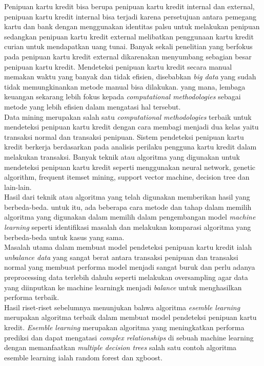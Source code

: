 Penipuan kartu kredit bisa berupa penipuan kartu kredit internal dan external, penipuan kartu kredit internal bisa terjadi karena persetujuan antara pemegang kartu dan bank dengan menggunakan identitas palsu untuk melakukan penipuan sedangkan penipuan kartu kredit external melibatkan penggunaan kartu kredit curian untuk mendapatkan uang tunai\cite{chaudhary2012review}. Banyak sekali penelitian yang berfokus pada penipuan kartu kredit external dikarenakan menyumbang sebagian besar penipuan kartu kredit\cite{chase_jpmorgan_fraud_management}. Mendeteksi penipuan kartu kredit secara manual memakan waktu yang banyak dan tidak efisien, disebabkan \textit{big data} yang sudah tidak memungkinankan metode manual bisa dilakukan. yang mana, lembaga keuangan sekarang lebih fokus kepada \textit{computational methodologies} sebagai metode yang lebih efisien dalam mengatasi hal tersebut\cite{west2016intelligent}.\\
Data mining merupakan salah satu \textit{computational methodologies} terbaik untuk mendeteksi penipuan kartu kredit dengan cara membagi menjadi dua kelas yaitu transaksi normal dan transaksi penipuan\cite{ngai2011application}. Sistem pendeteksi penipuan kartu kredit berkerja berdasarkan pada analisis perilaku pengguna kartu kredit dalam melakukan transaksi. Banyak teknik atau algoritma yang digunakan untuk mendeteksi penipuan kartu kredit seperti menggunakan neural network\cite{georgieva2019using}, genetic algorithm\cite{benchaji2019using}, frequent itemset mining\cite{seeja2014fraudminer}, support vector machine\cite{kumar2022credit}, decision tree\cite{gaikwad2014credit} dan lain-lain. \\
Hasil dari teknik atau algoritma yang telah digunakan memberikan hasil yang berbeda-beda. untuk itu, ada beberapa cara metode dan tahap dalam memilih algoritma yang digunakan dalam memilih dalam pengembangan model \textit{machine learning} seperti identifikasi masalah dan melakukan komparasi algoritma yang berbeda-beda untuk kasus yang sama\cite{mniai2023novel}.\\
Masalah utama dalam membuat model pendeteksi penipuan kartu kredit ialah \textit{unbalance data} yang sangat berat antara transaksi penipuan dan transaksi normal yang membuat performa model menjadi sangat buruk dan perlu adanya preprocessing data terlebih dahulu seperti melakukan oversampling agar data yang diinputkan ke machine learningk menjadi \textit{balance} untuk menghasilkan performa terbaik\cite{mniai2023novel}.\\
Hasil riset-riset sebelumnya menunjukan bahwa algoritma \textit{esemble learning} merupakan algoritma terbaik dalam membuat model pendeteksi penipuan kartu kredit\cite{ningsih2022analisis}. \textit{Esemble learning} merupakan algoritma yang meningkatkan performa prediksi dan dapat mengatasi \textit{complex relationships} di sebuah machine learning dengan memanfaatkan \textit{multiple decision trees} salah satu contoh  algoritma esemble learning ialah random forest dan xgboost\cite{dietterich2002ensemble}.\\
